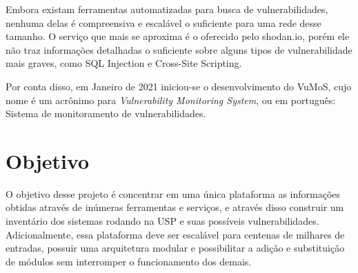 Embora existam ferramentas automatizadas para busca de vulnerabilidades, nenhuma delas é compreensiva e escalável o suficiente para uma rede desse tamanho. O serviço que mais se aproxima é o oferecido pelo 
shodan.io,
porém ele não traz informações detalhadas o suficiente sobre alguns tipos de vulnerabilidade mais graves, como 
SQL Injection e Cross-Site Scripting. 

Por conta disso, em Janeiro de 2021 iniciou-se o desenvolvimento do VuMoS, cujo nome é um acrônimo para \textit{Vulnerability Monitoring System}, ou em português: Sistema de monitoramento de vulnerabilidades.



\section{Objetivo}

O objetivo desse projeto é concentrar em uma única plataforma as informações obtidas através de inúmeras ferramentas e serviços, e através disso construir um inventário dos sistemas rodando na USP e suas possíveis vulnerabilidades. Adicionalmente, essa plataforma deve ser escalável para centenas de milhares de entradas, possuir uma arquitetura modular e possibilitar a adição e substituição de módulos sem interromper o funcionamento dos demais. 